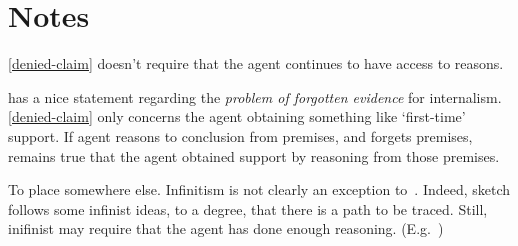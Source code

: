 \section{Notes}
\label{sec:notes}

\begin{note}[Memory]
  \ref{denied-claim} doesn't require that the agent continues to have access to reasons.

  \textcite[208]{Goldman:1999tr} has a nice statement regarding the \emph{problem of forgotten evidence} for internalism.
  \ref{denied-claim} only concerns the agent obtaining something like `first-time' support.
  If agent reasons to conclusion from premises, and forgets premises, remains true that the agent obtained support by reasoning from those premises.
\end{note}


\begin{note}
  {
    \color{red}
    To place somewhere else.
  }
  Infinitism is not clearly an exception to~\ESU{}.
  Indeed, sketch follows some infinist ideas, to a degree, that there is a path to be traced.
  Still, inifinist may require that the agent has done enough reasoning.
  (E.g.\ \textcite[10]{Klein:2007ve})
\end{note}

